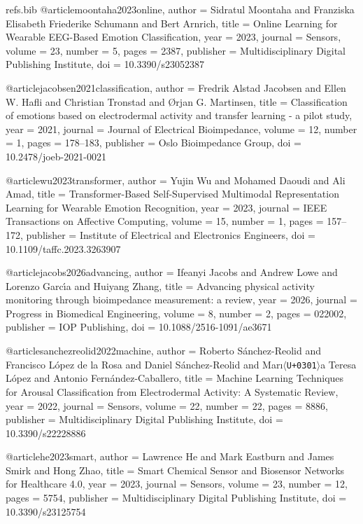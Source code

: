 \begin{filecontents*}[overwrite]{refs.bib}
@article{moontaha2023online,
  author = {Sidratul Moontaha and Franziska Elisabeth Friederike Schumann and Bert Arnrich},
  title = {{Online Learning for Wearable EEG-Based Emotion Classification}},
  year = {2023},
  journal = {Sensors},
  volume = {23},
  number = {5},
  pages = {2387},
  publisher = {Multidisciplinary Digital Publishing Institute},
  doi = {10.3390/s23052387}
}

@article{jacobsen2021classification,
  author = {Fredrik Alstad Jacobsen and Ellen W. Hafli and Christian Tronstad and {\O}rjan G. Martinsen},
  title = {{Classification of emotions based on electrodermal activity and transfer learning - a pilot study}},
  year = {2021},
  journal = {Journal of Electrical Bioimpedance},
  volume = {12},
  number = {1},
  pages = {178--183},
  publisher = {Oslo Bioimpedance Group},
  doi = {10.2478/joeb-2021-0021}
}

@article{wu2023transformer,
  author = {Yujin Wu and Mohamed Daoudi and Ali Amad},
  title = {{Transformer-Based Self-Supervised Multimodal Representation Learning for Wearable Emotion Recognition}},
  year = {2023},
  journal = {IEEE Transactions on Affective Computing},
  volume = {15},
  number = {1},
  pages = {157--172},
  publisher = {Institute of Electrical and Electronics Engineers},
  doi = {10.1109/taffc.2023.3263907}
}

@article{jacobs2026advancing,
  author = {Ifeanyi Jacobs and Andrew Lowe and Lorenzo Garc{\'\i}a and Huiyang Zhang},
  title = {{Advancing physical activity monitoring through bioimpedance measurement: a review}},
  year = {2026},
  journal = {Progress in Biomedical Engineering},
  volume = {8},
  number = {2},
  pages = {022002},
  publisher = {IOP Publishing},
  doi = {10.1088/2516-1091/ae3671}
}

@article{sanchezreolid2022machine,
  author = {Roberto S{\'a}nchez-Reolid and Francisco L{\'o}pez de la Rosa and Daniel S{\'a}nchez-Reolid and Mar{\i}\ensuremath{\langle}\texttt{U+0301}\ensuremath{\rangle}a Teresa L{\'o}pez and Antonio Fern{\'a}ndez{-}Caballero},
  title = {{Machine Learning Techniques for Arousal Classification from Electrodermal Activity: A Systematic Review}},
  year = {2022},
  journal = {Sensors},
  volume = {22},
  number = {22},
  pages = {8886},
  publisher = {Multidisciplinary Digital Publishing Institute},
  doi = {10.3390/s22228886}
}

@article{he2023smart,
  author = {Lawrence He and Mark Eastburn and James Smirk and Hong Zhao},
  title = {{Smart Chemical Sensor and Biosensor Networks for Healthcare 4.0}},
  year = {2023},
  journal = {Sensors},
  volume = {23},
  number = {12},
  pages = {5754},
  publisher = {Multidisciplinary Digital Publishing Institute},
  doi = {10.3390/s23125754}
}


\end{filecontents*}
